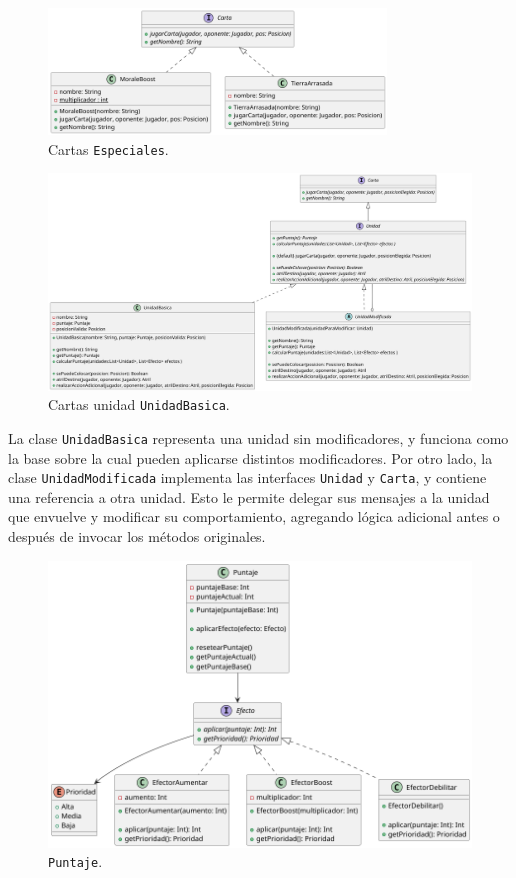 \documentclass[titlepage,a4paper]{article}
\begin{document}
	\begin{figure}[H]
		\centering
		\includegraphics[width=0.8\textwidth]{diagramas/clases/Especiales2}
		\caption{\label{fig:class052} Cartas \texttt{Especiales}.}
	\end{figure}

	\begin{figure}[H]
		\centering
		\includegraphics[width=1\textwidth]{diagramas/clases/UnidadBasica}
		\caption{\label{fig:class06}Cartas unidad \texttt{UnidadBasica}.}
	\end{figure}

	La clase \texttt{UnidadBasica} representa una unidad sin modificadores, y funciona como la base sobre la cual pueden aplicarse distintos modificadores.
	Por otro lado, la clase \texttt{UnidadModificada} implementa las interfaces \texttt{Unidad} y \texttt{Carta}, y contiene una referencia a otra unidad.
	Esto le permite delegar sus mensajes a la unidad que envuelve y modificar su comportamiento, agregando lógica adicional antes o después de invocar los métodos originales.

	\begin{figure}[H]
		\centering
		\includegraphics[width=1\textwidth]{diagramas/clases/Puntaje}
		\caption{\label{fig:class07}\texttt{Puntaje}.}
	\end{figure}
\end{document}
